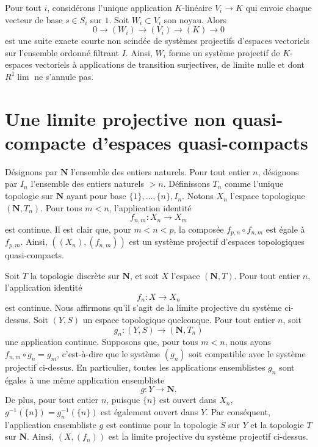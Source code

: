 \medskip\noindent
Pour tout $i$, considérons l'unique application $K$-linéaire $V_i \to K$ qui envoie
chaque vecteur de base $s \in S_i$ sur $1$. Soit $W_i \subset V_i$
son noyau. Alors
$$
0 \to (W_i) \to (V_i) \to (K) \to 0
$$
est une suite exacte courte non scindée de systèmes projectifs d'espaces vectoriels
sur l'ensemble ordonné filtrant $I$. Ainsi,
$W_i$ forme un système projectif de $K$-espaces vectoriels
à applications de transition surjectives, de limite nulle et dont
$R^1\lim$ ne s'annule pas.



\section{Une limite projective non quasi-compacte d'espaces quasi-compacts}
\label{section-lim-not-quasi-compact}

\noindent
Désignons par $\mathbf{N}$ l'ensemble des entiers naturels.
Pour tout entier $n$, désignons par $I_n$ l'ensemble des entiers naturels $> n$.
Définissons $T_n$ comme l'unique topologie sur $\mathbf{N}$ ayant pour base
$\{1\}, \ldots , \{n\}, I_n$.  Notons $X_n$ l'espace topologique
$(\mathbf{N}, T_n)$.  Pour tous $m < n$, l'application identité
$$
f_{n, m} : X_n \longrightarrow X_m
$$
est continue.  Il est clair que, pour $m < n < p$, la composée
$f_{p, n} \circ f_{n, m}$ est égale à $f_{p, m}$.  Ainsi, $((X_n), (f_{n,m}))$
est un système projectif d'espaces topologiques quasi-compacts.

\medskip\noindent
Soit $T$ la topologie discrète sur $\mathbf{N}$, et soit $X$
l'espace $(\mathbf{N}, T)$. Pour tout entier $n$, l'application identité
$$
f_n : X \longrightarrow X_n
$$
est continue. Nous affirmons qu'il s'agit de la limite projective du système
ci-dessus. Soit $(Y, S)$ un espace topologique quelconque. Pour tout entier $n$,
soit
$$
g_n : (Y, S) \longrightarrow (\mathbf{N}, T_n)
$$
une application continue. Supposons que, pour tous $m < n$, nous ayons
$f_{n,m} \circ g_n = g_m$, c'est-à-dire que le système $(g_n)$ soit compatible
avec le système projectif ci-dessus. En particulier, toutes les applications ensemblistes
$g_n$ sont égales à une même application ensembliste
$$
g : Y \longrightarrow \mathbf{N}.
$$
De plus, pour tout entier $n$, puisque $\{n\}$ est ouvert dans $X_n$,
$g^{-1}(\{n\}) = g_n^{-1}(\{n\})$ est également ouvert dans $Y$.
Par conséquent, l'application ensembliste $g$ est continue pour la topologie $S$ sur $Y$
et la topologie $T$ sur $\mathbf{N}$. Ainsi, $(X, (f_n))$ est la limite projective
du système projectif ci-dessus.


